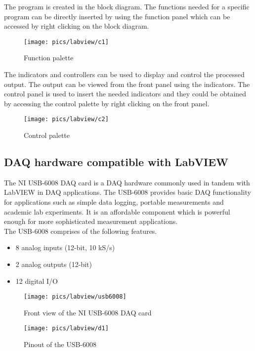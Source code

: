 \noindent
The program is created in the block diagram. The functions needed for a specific program can be directly inserted by using the function panel which can be accessed by right clicking on the block diagram.

\begin{figure}[!h]
	\centering
	\texttt{[image: pics/labview/c1]}
	\caption{Function palette}
	\label{fig:ha}
\end{figure}

\noindent
The indicators and controllers can be used to display and control the processed output. The output can be viewed from the front panel using the indicators. The control panel is used to insert the needed indicators and they could be obtained by accessing the control palette by right clicking on the front panel.

\pagebreak

\begin{figure}[!ht]
	\centering
	\texttt{[image: pics/labview/c2]}
	\caption{Control palette}
	\label{fig:ha}
\end{figure}


\subsection{DAQ hardware compatible with LabVIEW}

The NI USB-6008 DAQ card is a DAQ hardware commonly used in tandem with LabVIEW in DAQ  applications. The USB-6008 provides basic DAQ functionality for applications such as simple data logging, portable measurements and academic lab experiments. It is an affordable component which is powerful enough for more sophisticated measurement applications. \\

\noindent
The USB-6008 comprises of the following features.
\begin{itemize}
	\item 8 analog inputs (12-bit, 10 kS/s)
	\item 2 analog outputs (12-bit)
	\item 12 digital I/O
\end{itemize}


\pagebreak
\begin{figure}[!ht]
	\centering
	\texttt{[image: pics/labview/usb6008]}
	\caption{Front view of the NI USB-6008 DAQ card}
	\label{fig:usb6008}
\end{figure}


\begin{figure}[!hb]
	\centering
	\texttt{[image: pics/labview/d1]}
	\caption{Pinout of the USB-6008}
	\label{fig:d1}
\end{figure}

\pagebreak